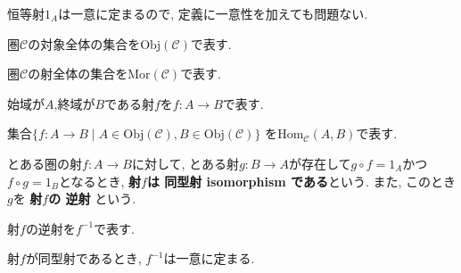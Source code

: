 \begin{caution}
恒等射$1_{A}$は一意に定まるので, 定義に一意性を加えても問題ない.
\end{caution}
\begin{Notation}
圏$\mathscr{C}$の対象全体の集合を$\mathrm{Obj}(\mathscr{C})$で表す.
\end{Notation}
\begin{Notation}
圏$\mathscr{C}$の射全体の集合を$\mathrm{Mor}(\mathscr{C})$で表す.
\end{Notation}

\begin{Notation}
始域が$A$,終域が$B$である射$f$を$f:A\rightarrow B$で表す.
\end{Notation}
\begin{Notation}
集合$\{f:A\rightarrow B\mid A\in\mathrm{Obj}(\mathscr{C}), B\in\mathrm{Obj}(\mathscr{C})\}$
を$\mathrm{Hom}_{\mathscr{C}}(A,B)$で表す.
\end{Notation}
\begin{Def}
とある圏の射$f:A\rightarrow B$に対して,
とある射$g:B\rightarrow A$が存在して$g\circ f=1_A$かつ$f\circ g=1_B$となるとき,
{\bf 射$f$は
同型射 isomorphism 
である}という. また, このとき$g$を
{\bf 射$f$の
逆射
}という.
\end{Def}
\begin{Notation}
射$f$の逆射を$f^{-1}$で表す.
\end{Notation}
\begin{Prop}
射$f$が同型射であるとき, $f^{-1}$は一意に定まる.
\end{Prop}
\begin{comment}
\begin{proof}
\end{proof}
\end{comment}

\begin{comment}
\subsection{情報隠蔽された対象の探究に圏論が提供する方法論}
オブジェクト指向プログラミングでは,「知らせる必要のない情報は隠蔽しておくほうが安全である」という{\bf 情報隠蔽}の考え方が重要視される.
これに対して, 圏論は, 対象がもつ情報が隠蔽されている状況下で, 射のみから対象について探究するという方法論を提供する.
\begin{example}
どのような要素をもつかわからない集合$A$について写像$f:A\rightarrow A$が定義されていて$f\circ f\circ f$が恒等写像になるとする.
このとき$A$が3つの要素$a_1,a_2,a_3$をもつと仮定することができ,
\[
f(a_1)=a_2, f(a_2)=a_3, 
f(a_3)=a_1
\]
というように, これらの要素が写像$f$によって回転していると考えることができる.
\end{example}
\end{comment}
